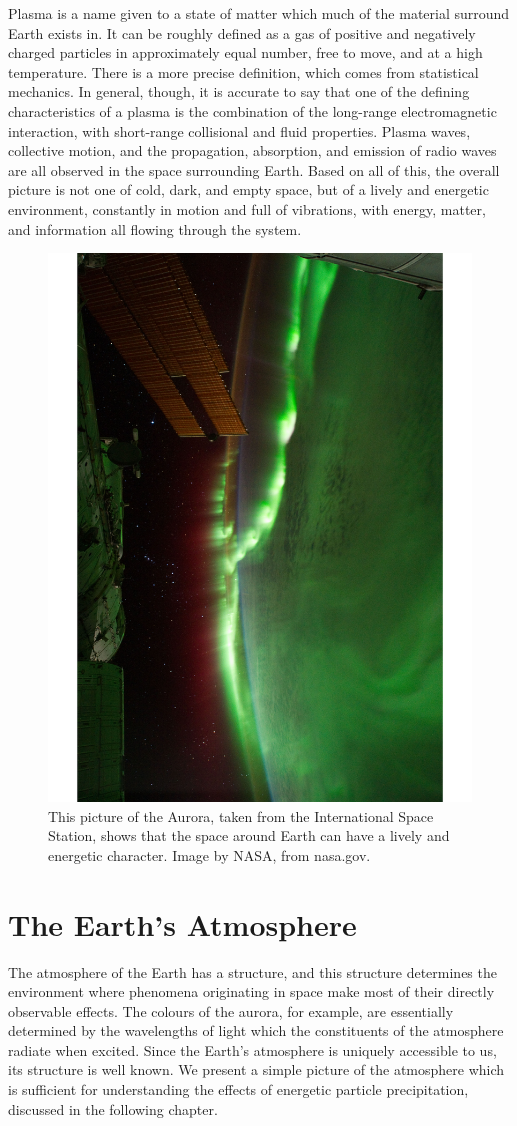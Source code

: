 Plasma is a name given to a state of matter which much of the material surround Earth exists in. It can be roughly defined as a gas of positive and negatively charged particles in approximately equal number, free to move, and at a high temperature. There is a more precise definition, which comes from statistical mechanics. In general, though, it is accurate to say that one of the defining characteristics of a plasma is the combination of the long-range electromagnetic interaction, with short-range collisional and fluid properties. Plasma waves, collective motion, and the propagation, absorption, and emission of radio waves are all observed in the space surrounding Earth. Based on all of this, the overall picture is not one of cold, dark, and empty space, but of a lively and energetic environment, constantly in motion and full of vibrations, with energy, matter, and information all flowing through the system. 

\begin{figure}[h]
\label{aurora_from_space}
\begin{centering}
\includegraphics[width=.5\textwidth,angle=270]{figures/chapter_1/aurora_from_space/aurora_from_space}
\caption{This picture of the Aurora, taken from the International Space Station, shows that the space around Earth can have a lively and energetic character. Image by NASA, from nasa.gov.}
\end{centering}
\end{figure}

\section{The Earth's Atmosphere}

The atmosphere of the Earth has a structure, and this structure determines the environment where phenomena originating in space make most of their directly observable effects. The colours of the aurora, for example, are essentially determined by the wavelengths of light which the constituents of the atmosphere radiate when excited. Since the Earth's atmosphere is uniquely accessible to us, its structure is well known. We present a simple picture of the atmosphere which is sufficient for understanding the effects of energetic particle precipitation, discussed in the following chapter.

